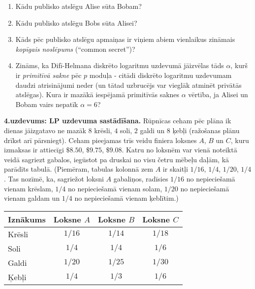 \documentclass[a4paper,12pt]{article}
\begin{document}
\begin{enumerate}[label=(\alph*)]
\item Kādu publisko atslēgu Alise sūta Bobam?
\item Kādu publisko atslēgu Bobs sūta Alisei?
\item Kāds pēc publisko atslēgu apmaiņas ir viņiem abiem vienlaikus zināmais 
{\em kopīgais noslēpums} (``common secret'')?
\item Zināms, ka Difī-Helmana diskrēto logaritmu uzdevumā jāizvēlas tāds $\alpha$, 
kurš ir {\em primitīvā sakne} pēc $p$ moduļa - citādi diskrēto 
logaritmu uzdevumam daudzi atrisinājumi neder (un tātad uzbrucējs var vieglāk 
atminēt privātās atslēgas). Kura ir mazākā iespējamā primitīvās saknes $\alpha$ vērtība,
ja Alisei un Bobam vairs nepatīk $\alpha=6$? 
\end{enumerate}


\vspace{6pt}
{\bf 4.uzdevums: LP uzdevuma sastādīšana.} 
Rūpnīcas ceham pēc plāna ik dienas
jāizgatavo ne mazāk $8$ krēsli, $4$ soli, $2$ galdi un $8$ ķebļi
(ražošanas plānu drīkst arī pārsniegt).
Ceham pieejamas trīs veidu finiera loksnes $A$, $B$ un $C$, 
kuru izmaksas ir attiecīgi $\$8.50$, $\$9.75$, $\$9.08$. 
Katru no loksnēm var vienā noteiktā veidā sagriezt gabalos, 
iegūstot pa druskai no visu četru mēbeļu daļām, kā parādīts tabulā.
(Piemēram, tabulas kolonnā zem $A$ ir skaitļi $1/16$, 
$1/4$, $1/20$, $1/4$. Tas nozīmē, ka, sagriežot loksni $A$ gabaliņos, 
radīsies $1/16$ no nepieciešamā vienam krēslam,
$1/4$ no nepieciešamā vienam solam, 
$1/20$ no nepieciešamā vienam galdam un
$1/4$ no nepieciešamā vienam ķeblītim.)

\begin{tabular}{|l|c|c|c|} \hline
{\bf Iznākums} & {\bf Loksne $A$} & {\bf Loksne $B$} & {\bf Loksne $C$} \\ \hline
Krēsli & $1/16$ & $1/14$ & $1/18$ \\ \hline
Soli & $1/4$ & $1/4$ & $1/6$ \\ \hline
Galdi & $1/20$ & $1/25$ & $1/30$ \\ \hline
Ķebļi & $1/4$ & $1/3$ & $1/6$ \\ \hline
\end{tabular}
\end{document}
